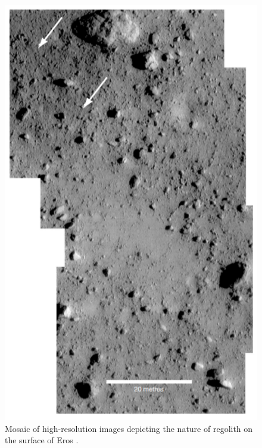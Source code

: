 \begin{figure}[htb]
\centering
\captionsetup{justification=centering}
\includegraphics[width=\linewidth, height=0.5\textheight, keepaspectratio=true]{eros_regolith.pdf}
\caption{Mosaic of high-resolution images depicting the nature of regolith on the surface of Eros \parencite{veverka2001landing}.}
\label{fig:eros_regolith}
\end{figure}
\FloatBarrier

